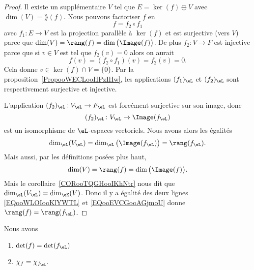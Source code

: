 \begin{proof}
    Il existe un supplémentaire \( V\) tel que \( E=\ker(f)\oplus V\) avec \( \dim(V)=\rang(f)\). Nous pouvons factoriser \( f\) en
    \begin{equation}
        f=f_2\circ f_1
    \end{equation}
    avec \( f_1\colon E\to V\) est la projection parallèle à \( \ker(f)\) et est surjective (vers \( V\)) parce que \( \dim(V)=\rang(f)=\dim\big( \Image(f) \big)\). De plus \( f_2\colon V\to F\) est injective parce que si \( v\in V\) est tel que \( f_2(v)=0\) alors on aurait
    \begin{equation}
        f(v)=(f_2\circ f_1)(v)=f_2(v)=0.
    \end{equation}
    Cela donne \( v\in\ker(f)\cap V=\{ 0 \}\). Par la proposition~\ref{PropooWECLooHPzIHw}, les applications \( (f_1)_{\eL}\) et \( (f_2)_{\eL}\) sont respectivement surjective et injective.

    L'application \( (f_2)_{\eL}\colon V_{\eL}\to F_{\eL}\) est forcément surjective sur son image, donc
    \begin{equation}
        (f_2)_{\eL}\colon V_{\eL}\to \Image(f_{\eL})
    \end{equation}
    est un isomorphisme de \( \eL\)-espaces vectoriels. Nous avons alors les égalités
    \begin{equation}        \label{EQooWLOIooKlYWTL}
        \dim_{\eL}(V_{\eL})=\dim_{\eL}\big( \Image(f_{\eL}) \big)=\rang(f_{\eL}).
    \end{equation}
    Mais aussi, par les définitions posées plus haut,
    \begin{equation}        \label{EQooEVCGooAGjmoU}
        \dim(V)=\rang(f)=\dim\big( \Image(f) \big).
    \end{equation}
    Mais le corollaire~\ref{CORooTQGHooIKhNtr} nous dit que \( \dim_{\eL}(V_{\eL})=\dim_{\eK}(V)\). Donc il y a égalité des deux lignes \eqref{EQooWLOIooKlYWTL} et \eqref{EQooEVCGooAGjmoU} donne \( \rang(f)=\rang(f_{\eL})\).
\end{proof}

\begin{proposition}     \label{PROPooZAZFooUFdCUv}
    Nous avons
    \begin{enumerate}
        \item
            \( \det(f)=\det(f_{\eL})\)
        \item
            \( \chi_f=\chi_{f_{\eL}}\).
    \end{enumerate}
\end{proposition}

